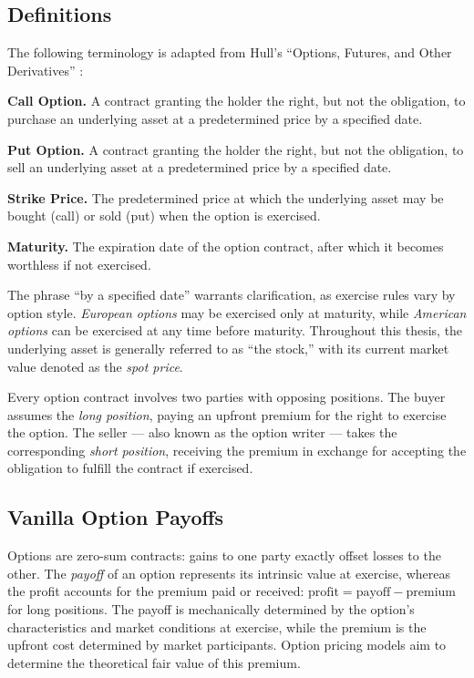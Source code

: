 \documentclass[english,12pt,a4paper,pdftex,sci,utf8]{aaltothesis}
\begin{document}
\subsection{Definitions}\label{subsec:definitions}
The following terminology is adapted from Hull's ``Options, Futures, and Other Derivatives'' \cite{hull2018}:

\vspace{0.5\baselineskip}
\noindent\textbf{Call Option.} A contract granting the holder the right, but not the obligation, to purchase an underlying asset at a predetermined price by a specified date.

\vspace{0.5\baselineskip}
\noindent\textbf{Put Option.} A contract granting the holder the right, but not the obligation, to sell an underlying asset at a predetermined price by a specified date.

\vspace{0.5\baselineskip}
\noindent\textbf{Strike Price.} The predetermined price at which the underlying asset may be bought (call) or sold (put) when the option is exercised.

\vspace{0.5\baselineskip}
\noindent\textbf{Maturity.} The expiration date of the option contract, after which it becomes worthless if not exercised.

\vspace{\baselineskip}
\noindent The phrase ``by a specified date'' warrants clarification, as exercise rules vary by option style. \emph{European options} may be exercised only at maturity, while \emph{American options} can be exercised at any time before maturity. Throughout this thesis, the underlying asset is generally referred to as ``the stock,'' with its current market value denoted as the \emph{spot price}.

Every option contract involves two parties with opposing positions. The buyer assumes the \emph{long position}, paying an upfront premium for the right to exercise the option. The seller --- also known as the option writer --- takes the corresponding \emph{short position}, receiving the premium in exchange for accepting the obligation to fulfill the contract if exercised.

\subsection{Vanilla Option Payoffs}\label{subsec:payoffs}

Options are zero-sum contracts: gains to one party exactly offset losses to the other. The \emph{payoff} of an option represents its intrinsic value at exercise, whereas the profit accounts for the premium paid or received: \mbox{$\text{profit} = \text{payoff} - \text{premium}$} for long positions. The payoff is mechanically determined by the option's characteristics and market conditions at exercise, while the premium is the upfront cost determined by market participants. Option pricing models aim to determine the theoretical fair value of this premium.
\end{document}
